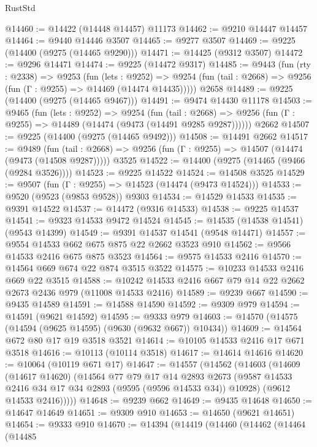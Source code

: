 \begin{lexlean}{RustStd}
\begin{coremodule}
@14460 := @14422 (@14448 @14457) @11173
@14462 := @9210 @14447 @14457
@14464 := @9440 @14446 @3507
@14465 := @9277 @3507
@14469 := @9225 (@14400 (@9275 (@14465 @9290)))
@14471 := @14425 (@9312 @3507)
@14472 := @9296 @14471
@14474 := @9225 (@14472 @9317)
@14485 := @9443
    (fun (rty : @2338) =>
    @9253
      (fun (lets : @9252) =>
      @9254 (fun (tail : @2668) => @9256 (fun (Γ : @9255) => @14469 (@14474 @14435)))))
    @2658
@14489 := @9225 (@14400 (@9275 (@14465 @9467)))
@14491 := @9474 @14430 @11178
@14503 := @9465
    (fun (lets : @9252) =>
    @9254
      (fun (tail : @2668) =>
      @9256 (fun (Γ : @9255) => @14489 (@14474 (@9473 (@14491 @9285 @9287))))))
    @2662
@14507 := @9225 (@14400 (@9275 (@14465 @9492)))
@14508 := @14491 @2662
@14517 := @9489
    (fun (tail : @2668) => @9256 (fun (Γ : @9255) => @14507 (@14474 (@9473 (@14508 @9287)))))
    @3525
@14522 := @14400 (@9275 (@14465 (@9466 (@9284 @3526))))
@14523 := @9225 @14522
@14524 := @14508 @3525
@14529 := @9507 (fun (Γ : @9255) => @14523 (@14474 (@9473 @14524)))
@14533 := @9520 (@9523 (@9853 @9528)) @9303
@14534 := @14529 @14533
@14535 := @9391 @14522
@14537 := @14472 (@9316 @14533)
@14538 := @9225 @14537
@14541 := @9323 @14533 @9472 @14524
@14545 := @14535 (@14538 @14541) (@9543 @14399)
@14549 := @9391 @14537 @14541 (@9548 @14471)
@14557 := @9554 @14533 @662 @675 @875 @22 @2662 @3523 @910
@14562 := @9566 @14533 @2416 @675 @875 @3523
@14564 := @9575 @14533 @2416
@14570 := @14564 @669 @674 @22 @874 @3515 @3522
@14575 := @10233 @14533 @2416 @669 @22 @3515
@14588 := @10242 @14533 @2416 @667 @79 @14 @22 @2662 @2673 @2436 @979 (@11008 @14533 @2416)
@14589 := @9239 @667
@14590 := @9435 @14589
@14591 := @14588 @14590
@14592 := @9309 @979
@14594 := @14591 (@9621 @14592)
@14595 := @9333 @979
@14603 := @14570 (@14575 (@14594 (@9625 @14595) (@9630 (@9632 @667)) @10434))
@14609 := @14564 @672 @80 @17 @19 @3518 @3521
@14614 := @10105 @14533 @2416 @17 @671 @3518
@14616 := @10113 (@10114 @3518)
@14617 := @14614 @14616
@14620 := @10064 (@10119 @671 @17)
@14647 := @14557
    (@14562
      (@14603
        (@14609
          (@14617 @14620)
          (@14564
            @77
            @79
            @17
            @14
            @2893
            @2673
            (@9587 @14533 @2416 @34 @17 @34 @2893 (@9595 (@9596 @14533 @34)) @10928)
            (@9612 @14533 @2416)))))
@14648 := @9239 @662
@14649 := @9435 @14648
@14650 := @14647 @14649
@14651 := @9309 @910
@14653 := @14650 (@9621 @14651)
@14654 := @9333 @910
@14670 := @14394
    (@14419
      (@14460
        (@14462
          (@14464
            (@14485

\end{coremodule}
\end{lexlean}
